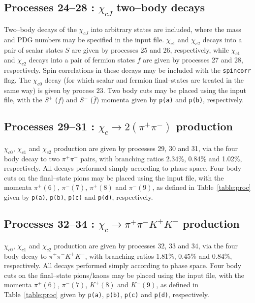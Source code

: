 \documentclass[12pt]{article}
\begin{document}
\subsection{Processes 24--28 : $\chi_{cJ}$ two--body decays}

Two--body decays of the $\chi_{cJ}$ into arbitrary states are included, where the mass and PDG numbers may be specified in the input file. 
$\chi_{c1}$ and $\chi_{c2}$ decays into a pair of scalar states $S$ are given by processes 25 and 26, respectively, while $\chi_{c1}$ and 
$\chi_{c2}$ decays into a pair of fermion states $f$ are given by processes 27 and 28, respectively. Spin correlations in these decays may be 
included with the \texttt{spincorr} flag.  The $\chi_{c0}$ decay (for which scalar and fermion final--states are treated in the same way) is 
given by process 23. Two body cuts may be placed using the input file, with the $S^+$ ($f$) and $S^-$ ($\overline{f}$) momenta given by \texttt{p(a)} 
and \texttt{p(b)}, respectively.

\subsection{Processes 29--31 : $\chi_c \to 2(\pi^+\pi^-)$ production}

$\chi_{c0}$, $\chi_{c1}$ and $\chi_{c2}$ production are given by processes 29, 30 and 31, via the four body decay to two $\pi^+\pi^-$ pairs, with 
branching ratios 2.34\%, 0.84\% and 1.02\%, respectively. All decays performed simply according to phase space. Four body cuts on the final--state 
pions may be placed using the input file, with the momenta $\pi^+(6)$, $\pi^-(7)$, $\pi^+(8)$ and $\pi^-(9)$, as defined in Table~\ref{table:proc} 
given by \texttt{p(a)}, \texttt{p(b)}, \texttt{p(c)} and \texttt{p(d)}, respectively.

\subsection{Processes 32--34 : $\chi_c \to \pi^+\pi^-K^+K^-$ production}

$\chi_{c0}$, $\chi_{c1}$ and $\chi_{c2}$ production are given by processes 32, 33 and 34, via the four body decay to $\pi^+\pi^-K^+K^-$, with branching 
ratios 1.81\%, 0.45\% and 0.84\%, respectively. All decays performed simply according to phase space. Four body cuts on the final--state pions/kaons may
 be placed using the input file, with the momenta $\pi^+(6)$, $\pi^-(7)$, $K^+(8)$ and $K^-(9)$, as defined in Table~\ref{table:proc} given by 
 \texttt{p(a)}, \texttt{p(b)}, \texttt{p(c)} and \texttt{p(d)}, respectively.
\end{document}
